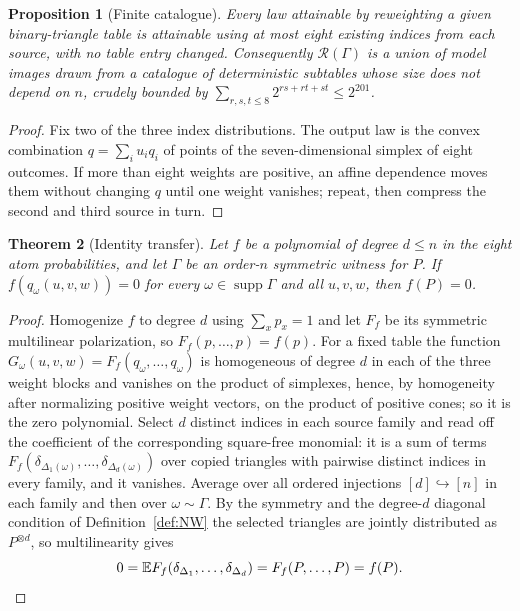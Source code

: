 \documentclass[11pt]{article}
\theoremstyle{plain}
\newtheorem{theorem}{Theorem}[section]
\newtheorem{proposition}[theorem]{Proposition}
\theoremstyle{definition}
\newcommand{\E}{\mathbb E}
\begin{document}
\begin{proposition}[Finite catalogue]\label{prop:compression}
Every law attainable by reweighting a given binary-triangle table is attainable using at most eight existing indices from each source, with no table entry changed. Consequently $\mathcal R(\Gamma)$ is a union of model images drawn from a catalogue of deterministic subtables whose size does not depend on $n$, crudely bounded by $\sum_{r,s,t\le8}2^{rs+rt+st}\le2^{201}$.
\end{proposition}

\begin{proof}
Fix two of the three index distributions. The output law is the convex combination $q=\sum_iu_iq_i$ of points of the seven-dimensional simplex of eight outcomes. If more than eight weights are positive, an affine dependence moves them without changing $q$ until one weight vanishes; repeat, then compress the second and third source in turn.
\end{proof}

\begin{theorem}[Identity transfer]\label{thm:identitytransfer}
Let $f$ be a polynomial of degree $d\le n$ in the eight atom probabilities, and let $\Gamma$ be an order-$n$ symmetric witness for $P$. If $f(q_\omega(u,v,w))=0$ for every $\omega\in\operatorname{supp}\Gamma$ and all $u,v,w$, then $f(P)=0$.
\end{theorem}

\begin{proof}
Homogenize $f$ to degree $d$ using $\sum_xp_x=1$ and let $F_f$ be its symmetric multilinear polarization, so $F_f(p,\dots,p)=f(p)$. For a fixed table the function $G_\omega(u,v,w)=F_f(q_\omega,\dots,q_\omega)$ is homogeneous of degree $d$ in each of the three weight blocks and vanishes on the product of simplexes, hence, by homogeneity after normalizing positive weight vectors, on the product of positive cones; so it is the zero polynomial. Select $d$ distinct indices in each source family and read off the coefficient of the corresponding square-free monomial: it is a sum of terms $F_f(\delta_{\Delta_1(\omega)},\dots,\delta_{\Delta_d(\omega)})$ over copied triangles with pairwise distinct indices in every family, and it vanishes. Average over all ordered injections $[d]\hookrightarrow[n]$ in each family and then over $\omega\sim\Gamma$. By the symmetry and the degree-$d$ diagonal condition of Definition~\ref{def:NW} the selected triangles are jointly distributed as $P^{\otimes d}$, so multilinearity gives
\[
0=\E F_f(\delta_{\Delta_1},\dots,\delta_{\Delta_d})=F_f(P,\dots,P)=f(P). \qedhere
\]
\end{proof}
\end{document}
